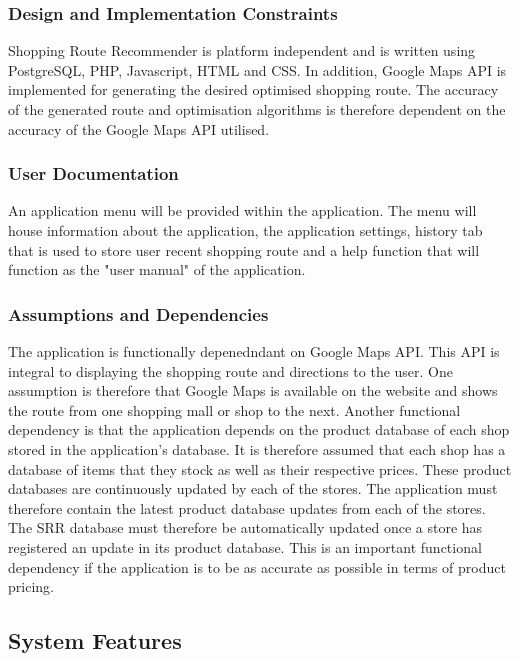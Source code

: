 \documentclass[10pt,twocolumn]{witseiepaper}
\begin{document}
		\subsubsection{Design and Implementation Constraints} 
		
			Shopping Route Recommender is platform independent and is written using PostgreSQL, PHP, Javascript, HTML and CSS. In addition, Google Maps API is implemented for generating the desired optimised shopping route. The accuracy of the generated route and optimisation algorithms is therefore dependent on the accuracy of the Google Maps API utilised. 
		
		\subsubsection{User Documentation}
		
			An application menu will be provided within the application. The menu will house information about the application, the application settings, history tab that is used to store user recent shopping route and a help function that will function as the "user manual" of the application. 
		
		\subsubsection{Assumptions and Dependencies}
		
			The application is functionally depenedndant on Google Maps API. This API is integral to displaying the shopping route and directions to the user. One assumption is therefore that Google Maps is available on the website and shows the route from one shopping mall or shop to the next. Another functional dependency is that the application depends on the product database of each shop stored in the application's database. It is therefore assumed that each shop has a database of items that they stock as well as their respective prices. These product databases are continuously updated by each of the stores. The application must therefore contain the latest product database updates from each of the stores. The SRR database must therefore be automatically updated once a store has registered an update in its product database. This is an important functional dependency if the application is to be as accurate as possible in terms of product pricing. 
		
	\subsection{System Features}
		
\end{document}

